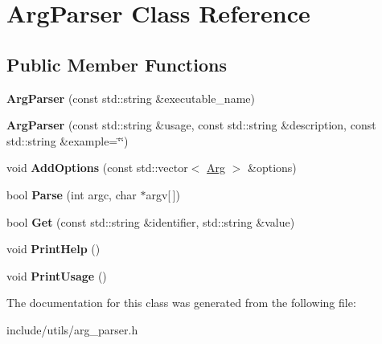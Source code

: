 \hypertarget{class_arg_parser}{}\section{Arg\+Parser Class Reference}
\label{class_arg_parser}
\subsection*{Public Member Functions}
\begin{DoxyCompactItemize}
\item 
\mbox{\label{class_arg_parser_abbbe25f3a4aa77c87b1dfe8d6976b6d8}} 
{\bfseries Arg\+Parser} (const std\+::string \&executable\+\_\+name)
\item 
\mbox{\label{class_arg_parser_a2d05062a5ef322cbb8b5f331bd9b13a5}} 
{\bfseries Arg\+Parser} (const std\+::string \&usage, const std\+::string \&description, const std\+::string \&example=\char`\"{}\char`\"{})
\item 
\mbox{\label{class_arg_parser_afad6c04e382002768c6fcdef2f644f58}} 
void {\bfseries Add\+Options} (const std\+::vector$<$ \hyperlink{struct_arg}{Arg} $>$ \&options)
\item 
\mbox{\label{class_arg_parser_a9f777677b59d6013a892565da39f0b95}} 
bool {\bfseries Parse} (int argc, char $\ast$argv\mbox{[}$\,$\mbox{]})
\item 
\mbox{\label{class_arg_parser_ab4fba75cb7f3a7cc604e16380548cef2}} 
bool {\bfseries Get} (const std\+::string \&identifier, std\+::string \&value)
\item 
\mbox{\label{class_arg_parser_a9520e62c0f99bed3a111791b74518c5d}} 
void {\bfseries Print\+Help} ()
\item 
\mbox{\label{class_arg_parser_a8c7365c7fc2ee805089ca83d1db04bfe}} 
void {\bfseries Print\+Usage} ()
\end{DoxyCompactItemize}


The documentation for this class was generated from the following file\+:\begin{DoxyCompactItemize}
\item 
include/utils/arg\+\_\+parser.\+h\end{DoxyCompactItemize}
